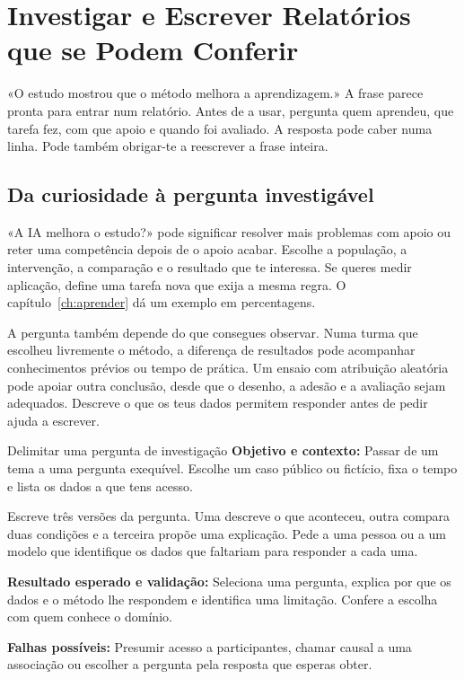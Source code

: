 \chapter{Investigar e Escrever Relatórios que se Podem Conferir}
\label{ch:investigacao}

«O estudo mostrou que o método melhora a aprendizagem.» A frase parece pronta para entrar num relatório. Antes de a usar, pergunta quem aprendeu, que tarefa fez, com que apoio e quando foi avaliado. A resposta pode caber numa linha. Pode também obrigar-te a reescrever a frase inteira.

\section{Da curiosidade à pergunta investigável}

«A IA melhora o estudo?» pode significar resolver mais problemas com apoio ou reter uma competência depois de o apoio acabar. Escolhe a população, a intervenção, a comparação e o resultado que te interessa. Se queres medir aplicação, define uma tarefa nova que exija a mesma regra. O capítulo~\ref{ch:aprender} dá um exemplo em percentagens.

A pergunta também depende do que consegues observar. Numa turma que escolheu livremente o método, a diferença de resultados pode acompanhar conhecimentos prévios ou tempo de prática. Um ensaio com atribuição aleatória pode apoiar outra conclusão, desde que o desenho, a adesão e a avaliação sejam adequados. Descreve o que os teus dados permitem responder antes de pedir ajuda a escrever.

\begin{promptlabbox}{Delimitar uma pergunta de investigação}
\textbf{Objetivo e contexto:} Passar de um tema a uma pergunta exequível. Escolhe um caso público ou fictício, fixa o tempo e lista os dados a que tens acesso.

Escreve três versões da pergunta. Uma descreve o que aconteceu, outra compara duas condições e a terceira propõe uma explicação. Pede a uma pessoa ou a um modelo que identifique os dados que faltariam para responder a cada uma.

\textbf{Resultado esperado e validação:} Seleciona uma pergunta, explica por que os dados e o método lhe respondem e identifica uma limitação. Confere a escolha com quem conhece o domínio.

\textbf{Falhas possíveis:} Presumir acesso a participantes, chamar causal a uma associação ou escolher a pergunta pela resposta que esperas obter.
\end{promptlabbox}

